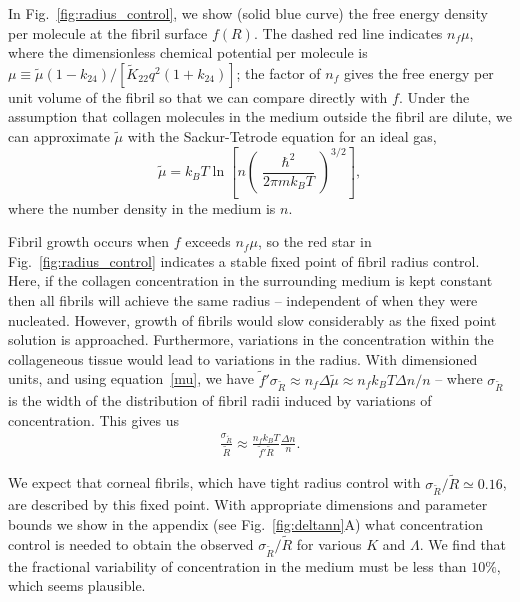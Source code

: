 \documentclass[twoside,twocolumn,9pt]{article}
\begin{document}
In Fig.~\ref{fig:radius_control}, we show (solid blue curve) the free energy density per molecule at the fibril surface $f(R)$. The dashed red line indicates $n_f \mu$, where the dimensionless chemical potential per molecule is $\mu \equiv \tilde{\mu} (1-k_{24})/\left[\tilde{K}_{22}q^2(1+k_{24})\right]$; the factor of $n_f$ gives the free energy per unit volume of the fibril so that we can compare directly with $f$.  Under the assumption that collagen molecules in the medium outside the fibril are dilute, we can approximate $\tilde{\mu}$ with the Sackur-Tetrode equation for an ideal gas, 
\begin{equation} \label{mu}
    \tilde{\mu} = k_BT \ln\left[ n\left(\frac{\hslash^2}{2\pi mk_BT}\right)^{3/2}\right],
\end{equation}
where the number density in the medium is $n$.

Fibril growth occurs when $f$ exceeds $ n_f \mu$, so the red star in Fig.~\ref{fig:radius_control} indicates a stable fixed point of fibril radius control. Here, if the collagen concentration in the surrounding medium is kept constant then all fibrils will achieve the same radius -- independent of when they were nucleated.  However, growth of fibrils would slow considerably as the fixed point solution is approached. Furthermore, variations in the concentration within the collageneous tissue would lead to variations in the radius. With dimensioned units, and using equation~\ref{mu}, we have $\tilde{f}' \sigma_{\tilde{R}}  \approx n_f \Delta \tilde{\mu} \approx n_f k_B T \Delta n/n$ -- where $\sigma_{\tilde{R}}$ is the width of the distribution of fibril radii induced by variations of concentration.  This gives us 
\begin{equation}\label{stable}
\begin{aligned}
     \frac{\sigma_{\tilde{R}}}{\tilde{R}} \approx  \frac{ n_f k_B T}{\tilde{f}' \tilde{R}} \frac{\Delta n}{n}. 
\end{aligned}
\end{equation}

We expect that corneal fibrils, which have tight radius control with $\sigma_{\tilde{R}}/\tilde{R} \simeq 0.16$, \cite{Cox:1970} are described by this fixed point. With appropriate dimensions and parameter bounds we show in the appendix (see Fig.~\ref{fig:deltann}A) what concentration control is needed to obtain the observed $\sigma_{\tilde{R}}/\tilde{R}$ for various $K$ and $\Lambda$. We find that the fractional variability of concentration in the medium must be less than $10\%$, which seems plausible. 
\end{document}
